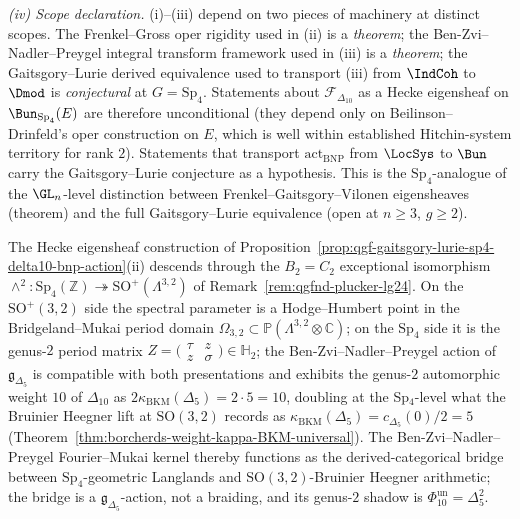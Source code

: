 \begin{proposition}
\emph{(iv) Scope declaration.} (i)--(iii) depend on two pieces of
machinery at distinct scopes. The Frenkel--Gross oper rigidity used
in (ii) is a \emph{theorem}; the Ben-Zvi--Nadler--Preygel integral
transform framework used in (iii) is a \emph{theorem}; the
Gaitsgory--Lurie derived equivalence used to transport (iii) from
$\IndCoh$ to $\Dmod$ is \emph{conjectural} at
$G=\mathrm{Sp}_4$. Statements about $\mathcal F_{\Delta_{10}}$ as a
Hecke eigensheaf on $\Bun_{\mathrm{Sp}_4}(E)$ are therefore
unconditional (they depend only on Beilinson--Drinfeld's oper
construction on $E$, which is well within established
Hitchin-system territory for rank $2$). Statements that transport
$\mathrm{act}_{\mathrm{BNP}}$ from $\LocSys$ to $\Bun$ carry the
Gaitsgory--Lurie conjecture as a hypothesis. This is the
$\mathrm{Sp}_4$-analogue
of the $\GL_n$-level distinction between Frenkel--Gaitsgory--Vilonen
eigensheaves (theorem) and the full Gaitsgory--Lurie equivalence
(open at $n\geq 3$, $g\geq 2$).
\end{proposition}

\begin{remark}[\texorpdfstring{$\Delta_{10}$}{Delta-10}, \texorpdfstring{$\mathfrak g_{\Delta_5}$}{g-Delta-5}, and the \texorpdfstring{$B_2=C_2$}{B-2=C-2} exceptional isomorphism]
\label{rem:qgf-delta10-gD5-B2C2-exceptional}
The Hecke eigensheaf construction of
Proposition~\ref{prop:qgf-gaitsgory-lurie-sp4-delta10-bnp-action}(ii)
descends through the $B_2=C_2$ exceptional isomorphism
$\wedge^2\colon\mathrm{Sp}_4(\mathbb Z)\twoheadrightarrow
\mathrm{SO}^+(\Lambda^{3,2})$ of
Remark~\ref{rem:qgfnd-plucker-lg24}. On the $\mathrm{SO}^+(3,2)$
side the spectral parameter is a Hodge--Humbert point in the
Bridgeland--Mukai period domain
$\Omega_{3,2}\subset\mathbb P(\Lambda^{3,2}\otimes\mathbb C)$; on the
$\mathrm{Sp}_4$ side it is the genus-$2$ period matrix
$Z=\bigl(\begin{smallmatrix}\tau & z\\ z & \sigma\end{smallmatrix}\bigr)
\in\mathbb H_2$; the Ben-Zvi--Nadler--Preygel action of
$\mathfrak g_{\Delta_5}$ is compatible with both presentations and
exhibits the genus-$2$ automorphic weight $10$ of $\Delta_{10}$ as
$2\kappa_{\mathrm{BKM}}(\Delta_5)=2\cdot 5=10$, doubling at the
Sp$_4$-level what the Bruinier Heegner lift at $\mathrm{SO}(3,2)$
records as $\kappa_{\mathrm{BKM}}(\Delta_5)=c_{\Delta_5}(0)/2=5$
(Theorem~\ref{thm:borcherds-weight-kappa-BKM-universal}). The Ben-Zvi--Nadler--Preygel Fourier--Mukai kernel thereby
functions as the derived-categorical bridge between
$\mathrm{Sp}_4$-geometric Langlands and $\mathrm{SO}(3,2)$-Bruinier
Heegner arithmetic; the bridge is a $\mathfrak g_{\Delta_5}$-action,
not a braiding, and its genus-$2$ shadow is
$\Phi_{10}^{\mathrm{un}}=\Delta_5^2$.
\end{remark}

